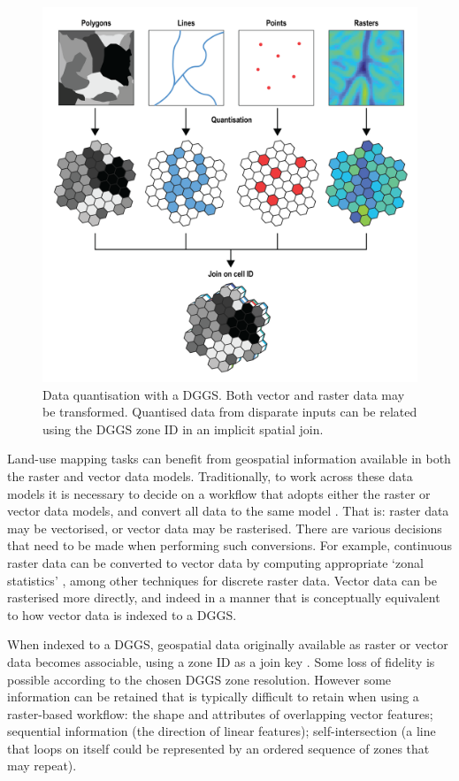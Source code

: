 \documentclass[]{interact}
\theoremstyle{plain}%
\theoremstyle{definition}
\theoremstyle{remark}
\begin{document}
\begin{figure}[t]
    \centering
    \includegraphics[width=0.65\linewidth]{images/DGGS_lu-01.png}
    \caption{Data quantisation with a \ac{DGGS}. Both vector and raster data may be transformed. Quantised data from disparate inputs can be related using the \ac{DGGS} zone ID in an implicit spatial join.}
    \label{fig:Interoperable}
\end{figure}

Land-use mapping tasks can benefit from geospatial information available in both the raster and vector data models. Traditionally, to work across these data models it is necessary to decide on a workflow that adopts either the raster or vector data models, and convert all data to the same model \citep{winter1998bridging,wade2003comparison}. That is: raster data may be vectorised, or vector data may be rasterised. There are various decisions that need to be made when performing such conversions. For example, continuous raster data can be converted to vector data by computing appropriate `zonal statistics' \citep{zhang2015efficient,singla2018distributed}, among other techniques for discrete raster data. Vector data can be rasterised more directly, and indeed in a manner that is conceptually equivalent to how vector data is indexed to a \ac{DGGS}.

When indexed to a \ac{DGGS}, geospatial data originally available as raster or vector data becomes associable, using a zone ID as a join key \citep{dutton1989modelling,sahr2019central}. Some loss of fidelity is possible according to the chosen \ac{DGGS} zone resolution. However some information can be retained that is typically difficult to retain when using a raster-based workflow: the shape and attributes of overlapping vector features; sequential information (the direction of linear features); self-intersection (a line that loops on itself could be represented by an ordered sequence of zones that may repeat).   
\end{document}
